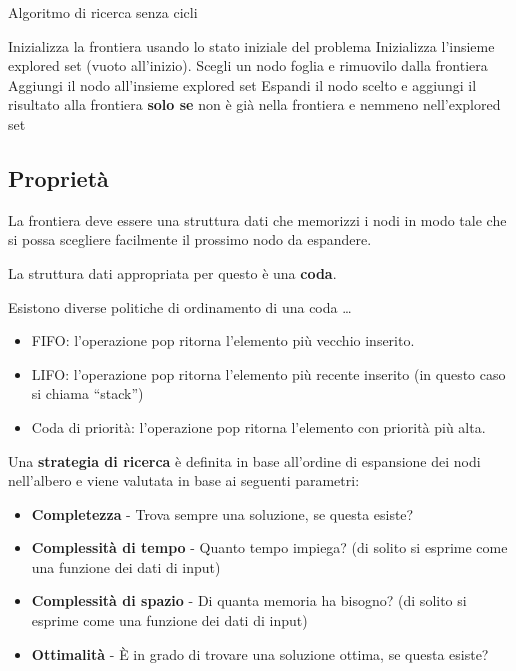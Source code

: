 \begin{algorithm}
    \caption{Algoritmo di ricerca senza cicli}
    \label{alg:search2}
    \begin{algorithmic}[1] %
         
			\State Inizializza la frontiera usando lo stato iniziale del problema
			\State Inizializza l'insieme explored set (vuoto all'inizio).
            \Loop
              \EndIf
            \State Scegli un nodo foglia e rimuovilo dalla frontiera
              \EndIf
			\State Aggiungi il nodo all'insieme explored set
            \State Espandi il nodo scelto e aggiungi il risultato alla
frontiera \textbf{solo se} non è già nella frontiera e nemmeno nell'explored
set 
			\EndLoop
        \EndProcedure
    \end{algorithmic}
\end{algorithm}

\subsection{Proprietà}

La frontiera deve essere una struttura dati che memorizzi i nodi in modo tale
che si possa scegliere facilmente il prossimo nodo da espandere.

La struttura dati appropriata per questo è una \textbf{coda}.

Esistono diverse politiche di ordinamento di una coda \dots

\begin{itemize}
\item FIFO: l'operazione pop ritorna l'elemento più vecchio inserito.
\item LIFO: l'operazione pop ritorna l'elemento più recente inserito (in questo
caso si chiama ``stack'')
\item Coda di priorità: l'operazione pop ritorna l'elemento con priorità più alta.
\end{itemize}

Una \textbf{strategia di ricerca} è definita in base all'ordine di espansione
dei nodi nell'albero e viene valutata in base ai seguenti parametri:

\begin{itemize}
\item \textbf{Completezza} - Trova sempre una soluzione, se questa esiste?
\item \textbf{Complessità di tempo} - Quanto tempo impiega? (di solito si
esprime come una funzione dei dati di input)
\item \textbf{Complessità di spazio} - Di quanta memoria ha bisogno?
(di solito si esprime come una funzione dei dati di input)
\item \textbf{Ottimalità} - È in grado di trovare una soluzione ottima,
se questa esiste?
\end{itemize}

